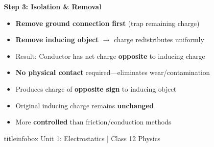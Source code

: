 \begin{frame}
\begin{examplebox}
\textbf{Step 3: Isolation \& Removal}
\begin{itemize}
    \item \textbf{Remove ground connection first} (trap remaining charge)
    \item \textbf{Remove inducing object} $\rightarrow$ charge redistributes uniformly
    \item Result: Conductor has net charge \textbf{opposite} to inducing charge
\end{itemize}

\vspace{0.1cm}
\end{examplebox}

\vspace{0.3cm}

\begin{importantbox}
\vspace{0.05cm}
\begin{itemize}
    \item \textbf{No physical contact} required—eliminates wear/contamination
    \item Produces charge of \textbf{opposite sign} to inducing object
    \item Original inducing charge remains \textbf{unchanged}
    \item More \textbf{controlled} than friction/conduction methods
\end{itemize}
\vspace{0.05cm}
\end{importantbox}

\vfill

\begin{beamercolorbox}[wd=\textwidth,ht=0.5cm,dp=0.1cm,center]{titleinfobox}
    \small\color{coolgray} Unit 1: Electrostatics | Class 12 Physics
\end{beamercolorbox}
\end{frame}

